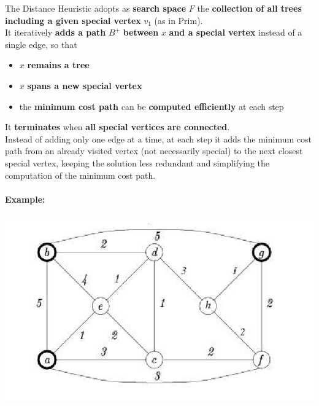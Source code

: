 \documentclass[11pt]{article}
\begin{document}
	The Distance Heuristic adopts as \textbf{search space} $F$ the \textbf{collection of all trees including a given special vertex} $v_1$ (as in Prim).\\
	
	It iteratively \textbf{adds a path} $B^+$ \textbf{between} $x$ \textbf{and a special vertex} instead of a single edge, so that
	\begin{itemize}
		\item $x$ \textbf{remains a tree}
		\item $x$ \textbf{spans a new special vertex}
		\item the \textbf{minimum cost path} can be \textbf{computed efficiently} at each step
	\end{itemize}
	
	It \textbf{terminates} when \textbf{all special vertices are connected}.\\
	
	Instead of adding only one edge at a time, at each step it adds the minimum cost path from an already visited vertex (not necessarily special) to the next closest special vertex, keeping the solution less redundant and simplifying the computation of the minimum cost path.\\
	
	\newpage
	
	\paragraph{Example:}
	\begin{center}
		\includegraphics[width=0.7\columnwidth]{img/STP2}
	\end{center}
	
\end{document}
